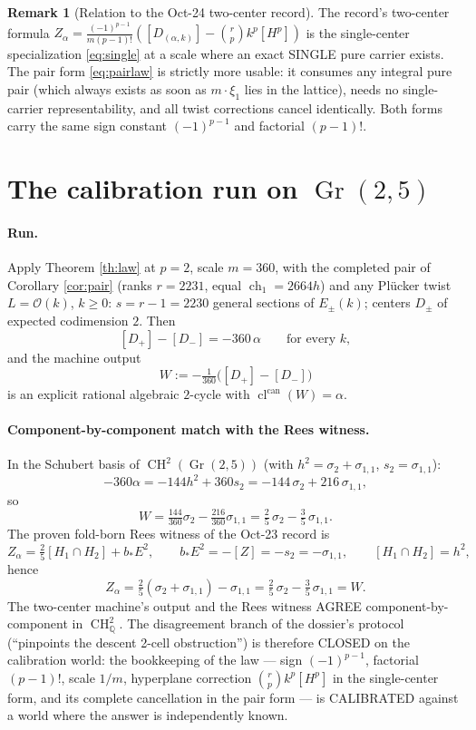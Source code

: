 \documentclass[11pt]{article}
\theoremstyle{definition}
\newtheorem{remark}[theorem]{Remark}
\newcommand{\ch}{\operatorname{ch}}
\newcommand{\Gr}{\operatorname{Gr}}
\newcommand{\cl}{\operatorname{cl}^{\operatorname{can}}}
\newcommand{\CH}{\operatorname{CH}}
\newcommand{\Oo}{\mathcal O}
\begin{document}
\begin{remark}[Relation to the Oct-24 two-center record]
The record's two-center formula
$Z_\alpha=\tfrac{(-1)^{p-1}}{m(p-1)!}([D_{(\alpha,k)}]
-\binom{r}{p}k^{p}[H^{p}])$ is the single-center specialization
\eqref{eq:single} at a scale where an exact SINGLE pure carrier
exists. The pair form \eqref{eq:pairlaw} is strictly more usable: it
consumes any integral pure pair (which always exists as soon as
$m\cdot\xi_1$ lies in the lattice), needs no single-carrier
representability, and all twist corrections cancel identically. Both
forms carry the same sign constant $(-1)^{p-1}$ and factorial
$(p-1)!$.
\end{remark}

\section{The calibration run on $\Gr(2,5)$}

\paragraph{Run.}
Apply Theorem \ref{th:law} at $p=2$, scale $m=360$, with the completed
pair of Corollary \ref{cor:pair} (ranks $r=2231$, equal
$\ch_1=2664h$) and any Pl\"ucker twist $L=\Oo(k)$, $k\ge0$:
$s=r-1=2230$ general sections of $E_\pm(k)$; centers $D_\pm$ of
expected codimension $2$. Then
\[
[D_+]-[D_-]=-360\,\alpha
\qquad\text{for every }k,
\]
and the machine output
\[
W:=-\tfrac1{360}\bigl([D_+]-[D_-]\bigr)
\]
is an explicit rational algebraic $2$-cycle with $\cl(W)=\alpha$.

\paragraph{Component-by-component match with the Rees witness.}
In the Schubert basis of $\CH^2(\Gr(2,5))$ (with
$h^2=\sigma_2+\sigma_{1,1}$, $s_2=\sigma_{1,1}$):
\[
-360\alpha=-144h^2+360s_2=-144\,\sigma_2+216\,\sigma_{1,1},
\]
so
\[
W=\tfrac{144}{360}\sigma_2-\tfrac{216}{360}\sigma_{1,1}
=\tfrac25\,\sigma_2-\tfrac35\,\sigma_{1,1}.
\]
The proven fold-born Rees witness of the Oct-23 record is
\[
Z_\alpha=\tfrac25[H_1\cap H_2]+b_*E^2,
\qquad b_*E^2=-[Z]=-s_2=-\sigma_{1,1},
\qquad [H_1\cap H_2]=h^2,
\]
hence
\[
Z_\alpha=\tfrac25(\sigma_2+\sigma_{1,1})-\sigma_{1,1}
=\tfrac25\,\sigma_2-\tfrac35\,\sigma_{1,1}=W .
\]
The two-center machine's output and the Rees witness AGREE
component-by-component in $\CH^2_{\mathbb Q}$. The disagreement branch
of the dossier's protocol (``pinpoints the descent 2-cell
obstruction'') is therefore CLOSED on the calibration world: the
bookkeeping of the law --- sign $(-1)^{p-1}$, factorial $(p-1)!$,
scale $1/m$, hyperplane correction $\binom rp k^p[H^p]$ in the
single-center form, and its complete cancellation in the pair form ---
is CALIBRATED against a world where the answer is independently known.
\end{document}
